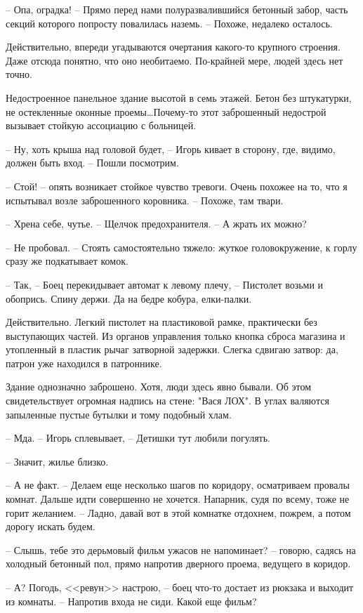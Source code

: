 \documentclass[a4paper]{book}
\begin{document}
-- Опа, оградка! -- Прямо перед нами полуразвалившийся бетонный забор, часть секций которого попросту повалилась наземь. -- Похоже, недалеко осталось. 

Действительно, впереди угадываются очертания какого-то крупного строения. Даже отсюда понятно, что оно необитаемо. По-крайней мере, людей здесь нет точно. 

Недостроенное панельное здание высотой в семь этажей. Бетон без штукатурки, не остекленные оконные проемы\ldots Почему-то этот заброшенный недострой вызывает стойкую ассоциацию с больницей. 

-- Ну, хоть крыша над головой будет, -- Игорь кивает в сторону, где, видимо, должен быть вход.  -- Пошли посмотрим. 

-- Стой! -- опять возникает стойкое чувство тревоги. Очень похожее на то, что я испытывал возле заброшенного коровника. -- Похоже, там твари.

-- Хрена себе, чутье. -- Щелчок предохранителя. -- А жрать их можно?

-- Не пробовал. -- Стоять самостоятельно тяжело: жуткое головокружение, к горлу сразу же подкатывает комок. 

-- Так, -- Боец перекидывает автомат к левому плечу, -- Пистолет возьми и обопрись. Спину держи. Да на бедре кобура, елки-палки. 

Действительно. Легкий пистолет на пластиковой рамке, практически без выступающих частей. Из органов управления только кнопка сброса магазина и утопленный в пластик рычаг затворной задержки. Слегка сдвигаю затвор: да, патрон уже находился в патроннике. 

Здание однозначно заброшено. Хотя, люди здесь явно бывали. Об этом свидетельствует огромная надпись на стене: "Вася ЛОХ". В углах валяются запыленные пустые бутылки и тому подобный хлам.

-- Мда. -- Игорь сплевывает, -- Детишки тут любили погулять. 

-- Значит, жилье близко. 

-- А не факт. -- Делаем еще несколько шагов по коридору, осматриваем провалы комнат. Дальше идти совершенно не хочется. Напарник, судя по всему, тоже не горит желанием. -- Ладно, давай вот в этой комнатке отдохнем, пожрем, а потом дорогу искать будем. 

-- Слышь, тебе это дерьмовый фильм ужасов не напоминает? -- говорю, садясь на холодный бетонный пол, прямо напротив дверного проема, ведущего в коридор.

-- А?  Погодь, <<ревун>> настрою, -- боец что-то достает из рюкзака и выходит из комнаты. --  Напротив входа не сиди. Какой еще фильм?
\end{document}

